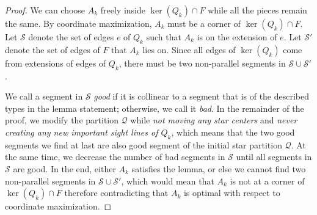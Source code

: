 \documentclass{theoretics}
\begin{document}
\begin{proof}
    We can choose $A_k$ freely inside $\ker(Q_k) \cap F$ while all the pieces remain the same. 
    By coordinate maximization, $A_k$ must be a corner of $\ker(Q_k) \cap F$.
    Let $\mathcal{S}$ denote the set of edges $e$ of $Q_k$ such that $A_k$ is on the extension of $e$. 
    Let $\mathcal{S'}$ denote the set of edges of $F$ that $A_k$ lies on. 
    Since all edges of $\ker(Q_k)$ come from extensions of edges of $Q_k$, there must be two non-parallel segments in $\mathcal{S} \cup \mathcal{S'}$.

    We call a segment in $\mathcal{S}$ \emph{good} if it is collinear to a segment that is of the described types in the lemma statement; otherwise, we call it \emph{bad}.
    In the remainder of the proof, we modify the partition $\mathcal{Q}$ while \textit{not moving any star centers} and \textit{never creating any new important sight lines of $Q_k$}, which means that the two good segments we find at last are also good segment of the initial star partition $\mathcal Q$. 
    At the same time, we decrease the number of bad segments in $\mathcal{S}$ until all segments in $\mathcal{S}$ are good.
    In the end, either $A_k$ satisfies the lemma, or else we cannot find two non-parallel segments in $\mathcal{S} \cup \mathcal{S}'$, which would mean that $A_k$ is not at a corner of $\ker(Q_k) \cap F$ therefore contradicting that $A_k$ is optimal with respect to coordinate maximization.


\end{proof}
\end{document}
